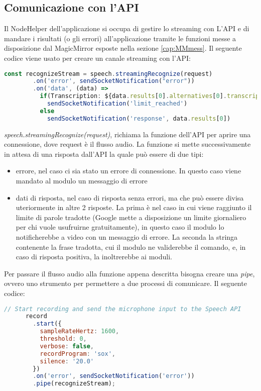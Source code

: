 \subsection{Comunicazione con l'API}\label{cap:api}
Il NodeHelper dell'applicazione si occupa di gestire lo streaming con L'API e
di mandare i risultati (o gli errori) all'applicazione tramite le funzioni messe
a disposizione dal MagicMirror esposte nella sezione \ref{cap:MMmess}.
Il seguente codice viene usato per creare un canale streaming con l'API:
\begin{lstlisting}[language=Javascript, caption={Codice per l'inoltro dell'audio al Servizio Google}, captionpos=b]
      const recognizeStream = speech.streamingRecognize(request)
        .on('error', sendSocketNotification("error"))
        .on('data', (data) =>
          if(Transcription: ${data.results[0].alternatives[0].transcript})
            sendSocketNotification('limit_reached')
          else
            sendSocketNotification('response', data.results[0])
\end{lstlisting}
\emph{speech.streamingRecognize(request)}, richiama la funzione dell'API per aprire una connessione, dove request \`e
il flusso audio.
La funzione si mette successivamente in attesa di una risposta dall'API la quale pu\`o essere di due tipi:
\begin{itemize}
\item errore, nel caso ci sia stato un errore di connessione. In questo caso viene mandato al modulo un messaggio di errore
\item dati di risposta, nel caso di risposta senza errori, ma che pu\`o essere divisa uteriormente in altre 2 risposte. La prima \`e nel caso in cui
viene raggiunto il limite di parole tradotte (Google mette a disposizione un limite giornaliero per chi vuole usufruirne gratuitamente), in questo caso
il modulo lo notificherebbe a video con un messaggio di errore. La seconda la stringa contenente la frase tradotta, cui il modulo ne validerebbe il comando,
e, in caso di risposta positiva, la inoltrerebbe ai moduli.\\[1\baselineskip]
\end{itemize}
Per passare il flusso audio alla funzione appena descritta bisogna creare una \emph{pipe}, ovvero uno strumento
per permettere a due processi di comunicare.
Il seguente codice:
\begin{lstlisting}[language=Javascript]
      // Start recording and send the microphone input to the Speech API
      record
        .start({
          sampleRateHertz: 1600,
          threshold: 0,
          verbose: false,
          recordProgram: 'sox',
          silence: '20.0'
        })
        .on('error', sendSocketNotification('error'))
        .pipe(recognizeStream);
\end{lstlisting}
